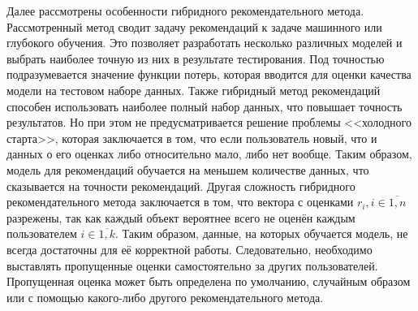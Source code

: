 Далее рассмотрены особенности гибридного рекомендательного метода.
Рассмотренный метод сводит задачу рекомендаций к задаче машинного или глубокого обучения.
Это позволяет разработать несколько различных моделей и выбрать наиболее точную из них в результате тестирования.
Под точностью подразумевается значение функции потерь, которая вводится для оценки качества модели на тестовом наборе данных.
Также гибридный метод рекомендаций способен использовать наиболее полный набор данных, что повышает точность результатов.
Но при этом не предусматривается решение проблемы <<холодного старта>>, которая заключается в том, что если пользователь новый, что и данных о его оценках либо относительно мало, либо нет вообще.
Таким образом, модель для рекомендаций обучается на меньшем количестве данных, что сказывается на точности рекомендаций.
Другая сложность гибридного рекомендательного метода заключается в том, что вектора с оценками $r_i, i \in \overline{1,n}$ разрежены, так как каждый объект вероятнее всего не оценён каждым пользователем $i \in \overline {1,k}$.
Таким образом, данные, на которых обучается модель, не всегда достаточны для её корректной работы.
Следовательно, необходимо выставлять пропущенные оценки самостоятельно за других пользователей.
Пропущенная оценка может быть определена по умолчанию, случайным образом или с помощью какого-либо другого рекомендательного метода.